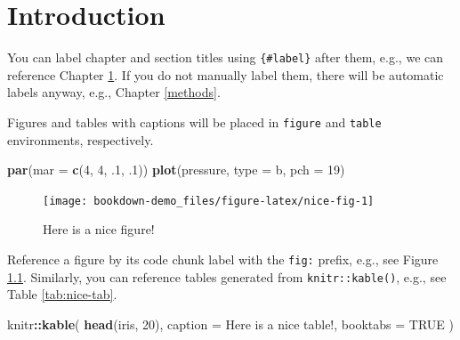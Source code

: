 \documentclass[
]{book}
\newenvironment{Shaded}{\begin{snugshade}}{\end{snugshade}}
\newcommand{\AttributeTok}[1]{\textcolor[rgb]{0.13,0.29,0.53}{#1}}
\newcommand{\ConstantTok}[1]{\textcolor[rgb]{0.56,0.35,0.01}{#1}}
\newcommand{\DecValTok}[1]{\textcolor[rgb]{0.00,0.00,0.81}{#1}}
\newcommand{\FunctionTok}[1]{\textcolor[rgb]{0.13,0.29,0.53}{\textbf{#1}}}
\newcommand{\NormalTok}[1]{#1}
\newcommand{\SpecialCharTok}[1]{\textcolor[rgb]{0.81,0.36,0.00}{\textbf{#1}}}
\newcommand{\StringTok}[1]{\textcolor[rgb]{0.31,0.60,0.02}{#1}}
\begin{document}
\hypertarget{intro}{%
\chapter{Introduction}\label{intro}}

You can label chapter and section titles using \texttt{\{\#label\}} after them, e.g., we can reference Chapter \ref{intro}. If you do not manually label them, there will be automatic labels anyway, e.g., Chapter \ref{methods}.

Figures and tables with captions will be placed in \texttt{figure} and \texttt{table} environments, respectively.

\begin{Shaded}
\begin{Highlighting}[]
\FunctionTok{par}\NormalTok{(}\AttributeTok{mar =} \FunctionTok{c}\NormalTok{(}\DecValTok{4}\NormalTok{, }\DecValTok{4}\NormalTok{, .}\DecValTok{1}\NormalTok{, .}\DecValTok{1}\NormalTok{))}
\FunctionTok{plot}\NormalTok{(pressure, }\AttributeTok{type =} \StringTok{\textquotesingle{}b\textquotesingle{}}\NormalTok{, }\AttributeTok{pch =} \DecValTok{19}\NormalTok{)}
\end{Highlighting}
\end{Shaded}

\begin{figure}

{\centering \texttt{[image: bookdown-demo\_files/figure-latex/nice-fig-1]} 

}

\caption{Here is a nice figure!}\label{fig:nice-fig}
\end{figure}

Reference a figure by its code chunk label with the \texttt{fig:} prefix, e.g., see Figure \ref{fig:nice-fig}. Similarly, you can reference tables generated from \texttt{knitr::kable()}, e.g., see Table \ref{tab:nice-tab}.

\begin{Shaded}
\begin{Highlighting}[]
\NormalTok{knitr}\SpecialCharTok{::}\FunctionTok{kable}\NormalTok{(}
  \FunctionTok{head}\NormalTok{(iris, }\DecValTok{20}\NormalTok{), }\AttributeTok{caption =} \StringTok{\textquotesingle{}Here is a nice table!\textquotesingle{}}\NormalTok{,}
  \AttributeTok{booktabs =} \ConstantTok{TRUE}
\NormalTok{)}
\end{Highlighting}
\end{Shaded}
\end{document}
